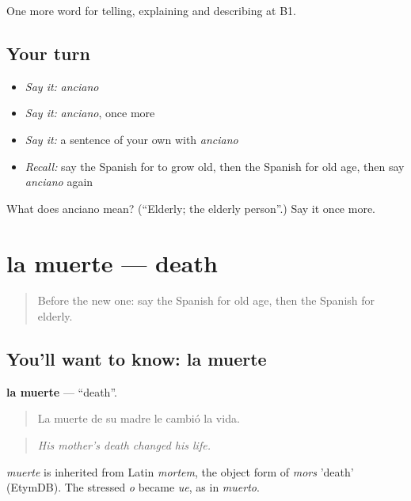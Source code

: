 \begin{grammarlens}[title={What you've built}]
One more word for telling, explaining and describing at B1.
\end{grammarlens}

\subsection*{Your turn}
\begin{itemize}
\raggedright
  \item \emph{Say it:} \emph{anciano}
  \item \emph{Say it:} \emph{anciano}, once more
  \item \emph{Say it:} a sentence of your own with \emph{anciano}
  \item \emph{Recall:} say the Spanish for to grow old, then the Spanish for old age, then say \emph{anciano} again
\end{itemize}

\begin{tcolorbox}[breakable,colback=teal!4,colframe=teal!35!black,title={Before you move on}]
What does anciano mean? (\textquotedblleft{}Elderly; the elderly person\textquotedblright{}.) Say it once more.
\end{tcolorbox}
\section[la muerte]{la muerte — death}

\label{lesson:ES-C555-muerte}



\begin{quote}
Before the new one: say the Spanish for old age, then the Spanish for elderly.
\end{quote}

\subsection*{You'll want to know: la muerte}
\textbf{la muerte} — \textquotedblleft{}death\textquotedblright{}.

\begin{quote}
La muerte de su madre le cambió la vida.
\end{quote}

\begin{quote}
\emph{His mother's death changed his life.}
\end{quote}

\begin{cousinweb}
\emph{muerte} is inherited from Latin \emph{mortem}, the object form of \emph{mors} 'death' (EtymDB). The stressed \emph{o} became \emph{ue}, as in \emph{muerto}.
\end{cousinweb}


